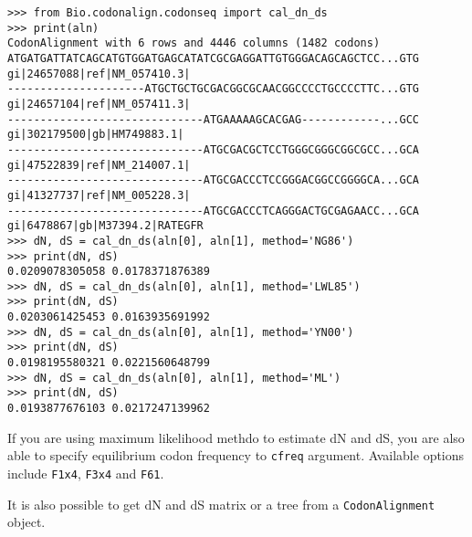 \documentclass{article}
\begin{document}
\begin{verbatim}
>>> from Bio.codonalign.codonseq import cal_dn_ds
>>> print(aln)
CodonAlignment with 6 rows and 4446 columns (1482 codons)
ATGATGATTATCAGCATGTGGATGAGCATATCGCGAGGATTGTGGGACAGCAGCTCC...GTG gi|24657088|ref|NM_057410.3|
---------------------ATGCTGCTGCGACGGCGCAACGGCCCCTGCCCCTTC...GTG gi|24657104|ref|NM_057411.3|
------------------------------ATGAAAAAGCACGAG------------...GCC gi|302179500|gb|HM749883.1|
------------------------------ATGCGACGCTCCTGGGCGGGCGGCGCC...GCA gi|47522839|ref|NM_214007.1|
------------------------------ATGCGACCCTCCGGGACGGCCGGGGCA...GCA gi|41327737|ref|NM_005228.3|
------------------------------ATGCGACCCTCAGGGACTGCGAGAACC...GCA gi|6478867|gb|M37394.2|RATEGFR
>>> dN, dS = cal_dn_ds(aln[0], aln[1], method='NG86')
>>> print(dN, dS)
0.0209078305058 0.0178371876389
>>> dN, dS = cal_dn_ds(aln[0], aln[1], method='LWL85')
>>> print(dN, dS)
0.0203061425453 0.0163935691992
>>> dN, dS = cal_dn_ds(aln[0], aln[1], method='YN00')
>>> print(dN, dS)
0.0198195580321 0.0221560648799
>>> dN, dS = cal_dn_ds(aln[0], aln[1], method='ML')
>>> print(dN, dS)
0.0193877676103 0.0217247139962
\end{verbatim}

If you are using maximum likelihood methdo to estimate dN and dS, you
are also able to specify equilibrium codon frequency to \texttt{cfreq}
argument. Available options include \texttt{F1x4}, \texttt{F3x4} and
\texttt{F61}.

It is also possible to get dN and dS matrix or a tree from a
\texttt{CodonAlignment} object.
\end{document}
